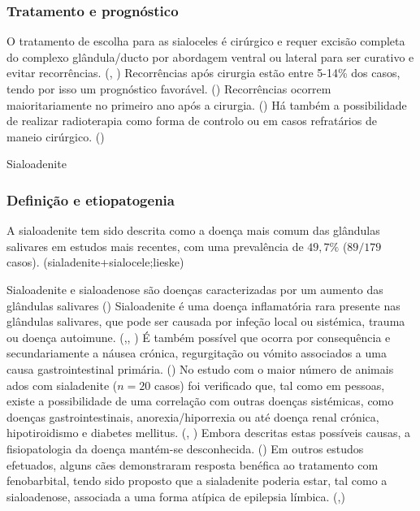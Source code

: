 \subsubsection{Tratamento e prognóstico}

O tratamento de escolha para as sialoceles é cirúrgico e requer excisão completa do complexo glândula/ducto por abordagem ventral ou lateral para ser curativo e evitar recorrências. (\cite{Poirier2018}, \cite{Swieton2022}) Recorrências após cirurgia estão entre 5-14\% dos casos, tendo por isso um prognóstico favorável. (\cite{Poirier2018}) Recorrências ocorrem maioritariamente no primeiro ano após a cirurgia. (\cite{Swieton2022}) Há também a possibilidade de realizar radioterapia como forma de controlo ou em casos refratários de maneio cirúrgico. (\cite{Poirier2018})

Sialoadenite
\subsubsection{Definição e etiopatogenia}
A sialoadenite tem sido descrita como a doença mais comum das glândulas salivares em estudos mais recentes, com uma prevalência de $49,7\%$  ($89/179$ casos). (sialadenite+sialocele;lieske)

Sialoadenite e sialoadenose são doenças caracterizadas por um aumento das glândulas salivares (\cite{Enache2025}) Sialoadenite é uma doença inflamatória rara presente nas glândulas salivares, que pode ser causada por infeção local ou sistémica, trauma ou doença autoimune. (\cite{supurativa},\cite{11cases}, \cite{sialadenite}) É também possível que ocorra por consequência e secundariamente a náusea crónica, regurgitação ou vómito associados a uma causa gastrointestinal primária. (\cite{McGill2009}) No estudo com o maior número de animais \cite{Kumar2017}ados com sialadenite ($n=20$ casos) foi verificado que, tal como em pessoas, existe a possibilidade de uma correlação com outras doenças sistémicas, como doenças gastrointestinais, anorexia/hiporrexia ou até doença renal crónica, hipotiroidismo e diabetes mellitus. (\cite{11cases}, \cite{Enache2025}) Embora descritas estas possíveis causas, a fisiopatologia da doença mantém-se desconhecida. (\cite{sialadenite}) Em outros estudos  efetuados, alguns cães demonstraram resposta benéfica ao tratamento com fenobarbital, tendo sido proposto que a sialadenite   poderia estar, tal como a sialoadenose, associada a uma forma atípica de epilepsia límbica. (\cite{Martinez2018},\cite{Park2022}) 
